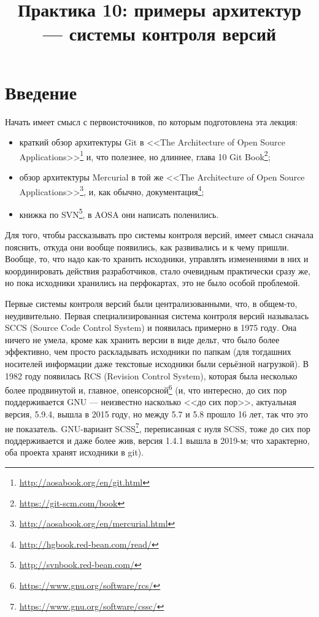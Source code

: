 \documentclass[a5paper]{article}
\title{Практика 10: примеры архитектур --- системы контроля версий}
\date{}
\begin{document}
\maketitle
\thispagestyle{empty}

\section{Введение}

Начать имеет смысл с первоисточников, по которым подготовлена эта лекция:
\begin{itemize}
    \item краткий обзор архитектуры Git в <<The Architecture of Open Source Applications>>\footnote{\url{http://aosabook.org/en/git.html}} и, что полезнее, но длиннее, глава 10 Git Book\footnote{\url{https://git-scm.com/book}};
    \item обзор архитектуры Mercurial в той же <<The Architecture of Open Source Applications>>\footnote{\url{http://aosabook.org/en/mercurial.html}}, и, как обычно, документация\footnote{\url{http://hgbook.red-bean.com/read/}};
    \item книжка по SVN\footnote{\url{http://svnbook.red-bean.com/}}, в AOSA они написать поленились.
\end{itemize}

Для того, чтобы рассказывать про системы контроля версий, имеет смысл сначала пояснить, откуда они вообще появились, как развивались и к чему пришли. Вообще, то, что надо как-то хранить исходники, управлять изменениями в них и координировать действия разработчиков, стало очевидным практически сразу же, но пока исходники хранились на перфокартах, это не было особой проблемой.

Первые системы контроля версий были централизованными, что, в общем-то, неудивительно. Первая специализированная система контроля версий называлась SCCS (Source Code Control System) и появилась примерно в 1975 году. Она ничего не умела, кроме как хранить версии в виде дельт, что было более эффективно, чем просто раскладывать исходники по папкам (для тогдашних носителей информации даже текстовые исходники были серьёзной нагрузкой). В 1982 году появилась RCS (Revision Control System), которая была несколько более продвинутой и, главное, опенсорсной\footnote{\url{https://www.gnu.org/software/rcs/}} (и, что интересно, до сих пор поддерживается GNU --- неизвестно насколько <<до сих пор>>, актуальная версия, 5.9.4, вышла в 2015 году, но между 5.7 и 5.8 прошло 16 лет, так что это не показатель. GNU-вариант SCSS\footnote{\url{https://www.gnu.org/software/cssc/}}, переписанная с нуля SCSS, тоже до сих пор поддерживается и даже более жив, версия 1.4.1 вышла в 2019-м; что характерно, оба проекта хранят исходники в git).
\end{document}
